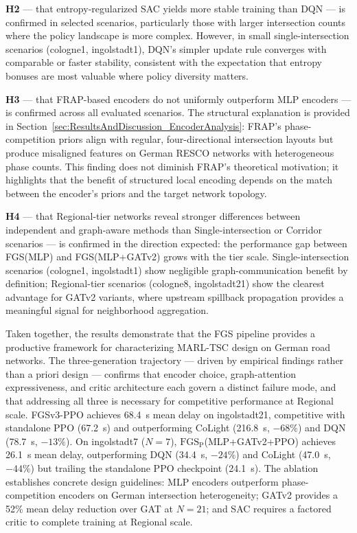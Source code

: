 \textbf{H2} — that entropy-regularized SAC yields more stable training than DQN — is confirmed in selected scenarios, particularly those with larger intersection counts where the policy landscape is more complex. However, in small single-intersection scenarios (cologne1, ingolstadt1), DQN's simpler update rule converges with comparable or faster stability, consistent with the expectation that entropy bonuses are most valuable where policy diversity matters.

\textbf{H3} — that FRAP-based encoders do not uniformly outperform MLP encoders — is confirmed across all evaluated scenarios. The structural explanation is provided in Section~\ref{sec:ResultsAndDiscussion_EncoderAnalysis}: FRAP's phase-competition priors align with regular, four-directional intersection layouts but produce misaligned features on German RESCO networks with heterogeneous phase counts. This finding does not diminish FRAP's theoretical motivation; it highlights that the benefit of structured local encoding depends on the match between the encoder's priors and the target network topology.

\textbf{H4} — that Regional-tier networks reveal stronger differences between independent and graph-aware methods than Single-intersection or Corridor scenarios — is confirmed in the direction expected: the performance gap between FGS(MLP) and FGS(MLP+GATv2) grows with the tier scale. Single-intersection scenarios (cologne1, ingolstadt1) show negligible graph-communication benefit by definition; Regional-tier scenarios (cologne8, ingolstadt21) show the clearest advantage for GATv2 variants, where upstream spillback propagation provides a meaningful signal for neighborhood aggregation.

Taken together, the results demonstrate that the FGS pipeline provides a productive framework for characterizing MARL-TSC design on German road networks. The three-generation trajectory — driven by empirical findings rather than a priori design — confirms that encoder choice, graph-attention expressiveness, and critic architecture each govern a distinct failure mode, and that addressing all three is necessary for competitive performance at Regional scale. FGSv3-PPO achieves 68.4~s mean delay on ingolstadt21, competitive with standalone PPO (67.2~s) and outperforming CoLight (216.8~s, $-68\%$) and DQN (78.7~s, $-13\%$). On ingolstadt7 ($N=7$), $\text{FGS}_\text{P}$(MLP+GATv2+PPO) achieves 26.1~s mean delay, outperforming DQN (34.4~s, $-24\%$) and CoLight (47.0~s, $-44\%$) but trailing the standalone PPO checkpoint (24.1~s). The ablation establishes concrete design guidelines: MLP encoders outperform phase-competition encoders on German intersection heterogeneity; GATv2 provides a 52\% mean delay reduction over GAT at $N=21$; and SAC requires a factored critic to complete training at Regional scale.

